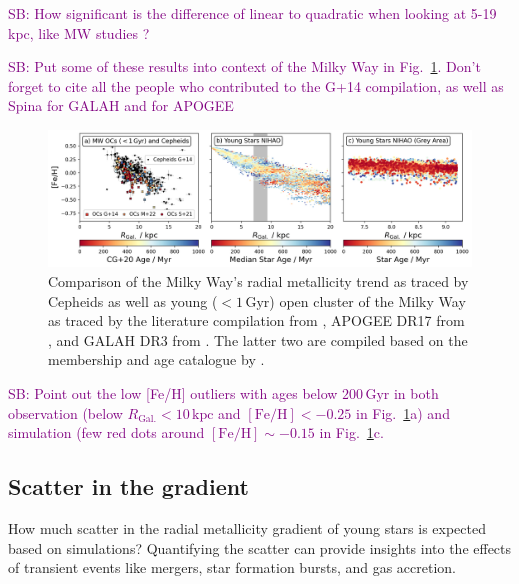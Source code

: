 \documentclass[fleqn,usenatbib]{mnras}
\newcommand{\SB}[1]{{\textcolor{purple}{SB: #1}}}
\begin{document}
\SB{How significant is the difference of linear to quadratic when looking at 5-19 kpc, like MW studies \citep{Genovali2014}?}

\SB{Put some of these results into context of the Milky Way in Fig.~\ref{fig:radial_metallicity_gradients_mw_vs_nihao}. Don't forget to cite all the people who contributed to the G+14 compilation, as well as Spina for GALAH and \citet{Myers2022, Donor2020} for APOGEE}

\begin{figure}
    \centering
    \includegraphics[width=\textwidth]{figures/radial_metallicity_gradients_mw_vs_nihao.png}
    \caption{Comparison of the Milky Way's radial metallicity trend as traced by Cepheids \citep[black triangles, compiled from literature by][G+14]{Genovali2014} as well as young ($< 1\,\mathrm{Gyr}$) open cluster of the Milky Way as traced by the literature compilation from \citet[][G+14 as squares]{Genovali2014}, APOGEE DR17 from \citet[][M+22 as crosses]{Myers2022}, and GALAH DR3 from \citet[][S+21 as circles]{Spina2021}. The latter two are compiled based on the membership and age catalogue by \citet[][CG+20]{CantatGaudin2020}.
    }
    \label{fig:radial_metallicity_gradients_mw_vs_nihao}
\end{figure}

\SB{Point out the low [Fe/H] outliers with ages below $200\,\mathrm{Gyr}$ in both observation (below $R_\mathrm{Gal.} < 10\,\mathrm{kpc}$ and $\mathrm{[Fe/H]} < -0.25$ in Fig.~\ref{fig:radial_metallicity_gradients_mw_vs_nihao}a) and simulation (few red dots around $\mathrm{[Fe/H]} \sim -0.15$ in Fig.~\ref{fig:radial_metallicity_gradients_mw_vs_nihao}c.}



\subsection{Scatter in the gradient} \label{sec:discussion_scatter}

How much scatter in the radial metallicity gradient of young stars is expected based on simulations? Quantifying the scatter can provide insights into the effects of transient events like mergers, star formation bursts, and gas accretion.
\end{document}

